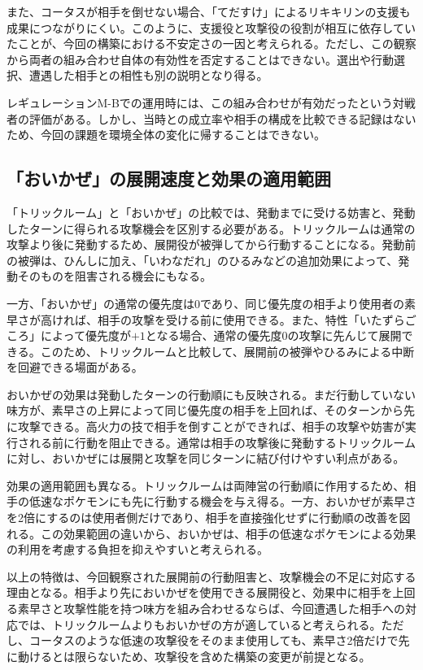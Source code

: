 \documentclass[a4paper,10pt]{ltjsarticle}
\begin{document}
また、コータスが相手を倒せない場合、「てだすけ」によるリキキリンの支援も成果につながりにくい。このように、支援役と攻撃役の役割が相互に依存していたことが、今回の構築における不安定さの一因と考えられる。ただし、この観察から両者の組み合わせ自体の有効性を否定することはできない。選出や行動選択、遭遇した相手との相性も別の説明となり得る。

レギュレーションM-Bでの運用時には、この組み合わせが有効だったという対戦者の評価がある。しかし、当時との成立率や相手の構成を比較できる記録はないため、今回の課題を環境全体の変化に帰することはできない。

\subsection{「おいかぜ」の展開速度と効果の適用範囲}
\label{sec:tailwind}

「トリックルーム」と「おいかぜ」の比較では、発動までに受ける妨害と、発動したターンに得られる攻撃機会を区別する必要がある。トリックルームは通常の攻撃より後に発動するため、展開役が被弾してから行動することになる。発動前の被弾は、ひんしに加え、「いわなだれ」のひるみなどの追加効果によって、発動そのものを阻害される機会にもなる。

一方、「おいかぜ」の通常の優先度は$0$であり、同じ優先度の相手より使用者の素早さが高ければ、相手の攻撃を受ける前に使用できる。また、特性「いたずらごころ」によって優先度が$+1$となる場合、通常の優先度$0$の攻撃に先んじて展開できる。このため、トリックルームと比較して、展開前の被弾やひるみによる中断を回避できる場面がある。

おいかぜの効果は発動したターンの行動順にも反映される。まだ行動していない味方が、素早さの上昇によって同じ優先度の相手を上回れば、そのターンから先に攻撃できる。高火力の技で相手を倒すことができれば、相手の攻撃や妨害が実行される前に行動を阻止できる。通常は相手の攻撃後に発動するトリックルームに対し、おいかぜには展開と攻撃を同じターンに結び付けやすい利点がある。

効果の適用範囲も異なる。トリックルームは両陣営の行動順に作用するため、相手の低速なポケモンにも先に行動する機会を与え得る。一方、おいかぜが素早さを2倍にするのは使用者側だけであり、相手を直接強化せずに行動順の改善を図れる。この効果範囲の違いから、おいかぜは、相手の低速なポケモンによる効果の利用を考慮する負担を抑えやすいと考えられる。

以上の特徴は、今回観察された展開前の行動阻害と、攻撃機会の不足に対応する理由となる。相手より先においかぜを使用できる展開役と、効果中に相手を上回る素早さと攻撃性能を持つ味方を組み合わせるならば、今回遭遇した相手への対応では、トリックルームよりもおいかぜの方が適していると考えられる。ただし、コータスのような低速の攻撃役をそのまま使用しても、素早さ2倍だけで先に動けるとは限らないため、攻撃役を含めた構築の変更が前提となる。
\end{document}
